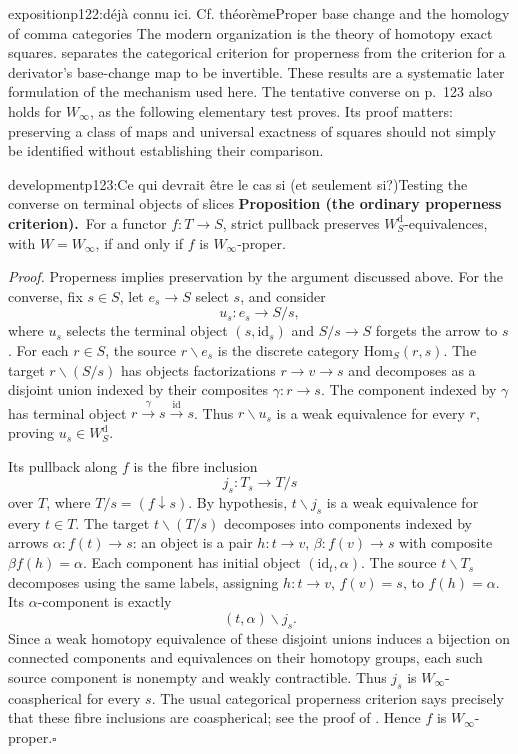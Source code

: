 \begin{dcomment}{exposition}{p122:déjà connu ici. Cf. théorème}{Proper base change and the homology of comma categories}
The modern organization is the theory of homotopy exact squares. \citet[Proposition~2.13 and Theorem~4.32]{Maltsiniotis2012Exact} separates the categorical criterion for properness from the criterion for a derivator's base-change map to be invertible. These results are a systematic later formulation of the mechanism used here. The tentative converse on p.~123 also holds for $W_\infty$, as the following elementary test proves. Its proof matters: preserving a class of maps and universal exactness of squares should not simply be identified without establishing their comparison.
\end{dcomment}

\begin{dcomment}{development}{p123:Ce qui devrait être le cas si (et seulement si?)}{Testing the converse on terminal objects of slices}
\textbf{Proposition (the ordinary properness criterion).}\ours\
For a functor $f:T\to S$, strict pullback preserves $W_S^{\mathrm d}$-equivalences, with $W=W_\infty$, if and only if $f$ is $W_\infty$-proper.

\textit{Proof.} Properness implies preservation by the argument discussed above. For the converse, fix $s\in S$, let $e_s\to S$ select $s$, and consider
\[
 u_s:e_s\longrightarrow S/s,
\]
where $u_s$ selects the terminal object $(s,\mathrm{id}_s)$ and $S/s\to S$ forgets the arrow to $s$. For each $r\in S$, the source $r\backslash e_s$ is the discrete category $\mathrm{Hom}_S(r,s)$. The target $r\backslash(S/s)$ has objects factorizations $r\to v\to s$ and decomposes as a disjoint union indexed by their composites $\gamma:r\to s$. The component indexed by $\gamma$ has terminal object $r\xrightarrow{\gamma}s\xrightarrow{\mathrm{id}}s$. Thus $r\backslash u_s$ is a weak equivalence for every $r$, proving $u_s\in W_S^{\mathrm d}$.

Its pullback along $f$ is the fibre inclusion
\[
 j_s:T_s\longrightarrow T/s
\]
over $T$, where $T/s=(f\downarrow s)$. By hypothesis, $t\backslash j_s$ is a weak equivalence for every $t\in T$. The target $t\backslash(T/s)$ decomposes into components indexed by arrows $\alpha:f(t)\to s$: an object is a pair $h:t\to v$, $\beta:f(v)\to s$ with composite $\beta f(h)=\alpha$. Each component has initial object $(\mathrm{id}_t,\alpha)$. The source $t\backslash T_s$ decomposes using the same labels, assigning $h:t\to v$, $f(v)=s$, to $f(h)=\alpha$. Its $\alpha$-component is exactly
\[
 (t,\alpha)\backslash j_s.
\]
Since a weak homotopy equivalence of these disjoint unions induces a bijection on connected components and equivalences on their homotopy groups, each such source component is nonempty and weakly contractible. Thus $j_s$ is $W_\infty$-coaspherical for every $s$. The usual categorical properness criterion says precisely that these fibre inclusions are coaspherical; see the proof of \citet[Proposition~2.13]{Maltsiniotis2012Exact}. Hence $f$ is $W_\infty$-proper.\hfill$\square$


\end{dcomment}
